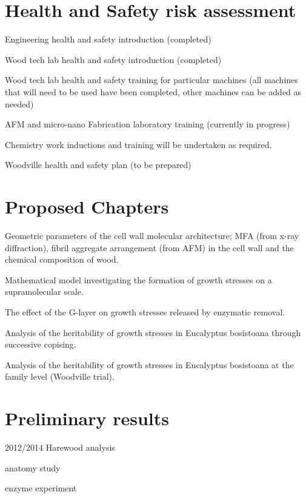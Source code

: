 \documentclass{article}
\begin{document}
\section{Health and Safety risk assessment}
Engineering health and safety introduction (completed)

Wood tech lab health and safety introduction (completed)

Wood tech lab health and safety training for particular machines (all machines
that will need to be used have been completed, other machines can be added as
needed)

AFM and micro-nano Fabrication laboratory training (currently in progress)

Chemistry work inductions and training will be undertaken as required.

Woodville health and safety plan (to be prepared)




\section{Proposed Chapters}
Geometric parameters of the cell wall molecular architecture; MFA (from x-ray
diffraction), fibril aggregate arrangement (from AFM) in the  cell wall and the
chemical composition of wood.

Mathematical model investigating the formation of growth stresses on a
supramolecular scale.

The effect of the G-layer on growth stresses released by enzymatic removal.

Analysis of the heritability of growth stresses in Eucalyptus bosistoana through
successive copising.

Analysis of the heritability of growth stresses in Eucalyptus bosistoana at the
family level (Woodville trial).



\section{Preliminary results}
2012/2014 Harewood analysis

anatomy study

enzyme experiment
\end{document}
